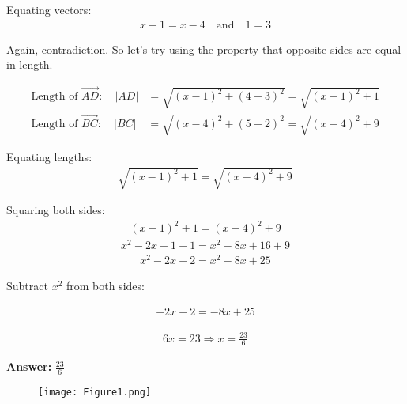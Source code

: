 \documentclass[journal]{IEEEtran}
\begin{document}
Equating vectors:
\begin{align}
x - 1 = x - 4 \quad \text{and} \quad 1 = 3
\end{align}

Again, contradiction. So let's try using the property that opposite sides are equal in length.

\begin{align}
\text{Length of } \vec{AD}: \quad |AD| &= \sqrt{(x - 1)^2 + (4 - 3)^2} = \sqrt{(x - 1)^2 + 1} \\
\text{Length of } \vec{BC}: \quad |BC| &= \sqrt{(x - 4)^2 + (5 - 2)^2} = \sqrt{(x - 4)^2 + 9}
\end{align}

Equating lengths:
\begin{align}
\sqrt{(x - 1)^2 + 1} = \sqrt{(x - 4)^2 + 9}
\end{align}

Squaring both sides:
\begin{align}
(x - 1)^2 + 1 = (x - 4)^2 + 9
\end{align}
\begin{align}
x^2 - 2x + 1 + 1 = x^2 - 8x + 16 + 9
\end{align}
\begin{align}
x^2 - 2x + 2 = x^2 - 8x + 25
\end{align}

Subtract $x^2$ from both sides:

\begin{align}
-2x + 2 = -8x + 25
\end{align}

\begin{align}
6x = 23 \Rightarrow x = \frac{23}{6}
\end{align}

\textbf{Answer:} $ \boxed{\frac{23}{6}} $

\begin{figure}[h!]
    \centering
    \texttt{[image: Figure1.png]}
    \label{figure_1}
\end{figure}
\end{document}
